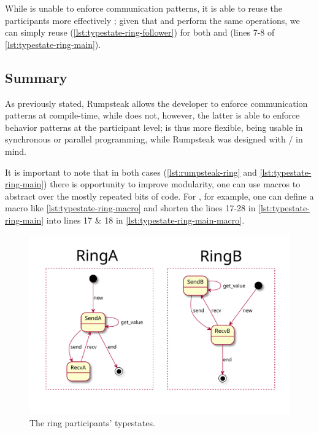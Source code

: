 While \textcolor{attrgreen}{} is unable to enforce communication patterns,
it is able to reuse the participants more effectively ;
given that \textcolor{structblue}{} and \textcolor{structblue}{} perform the same operations, we can simply reuse \textcolor{structblue}{} (\autoref{lst:typestate-ring-follower})
for both \textcolor{structblue}{} and \textcolor{structblue}{} (lines 7-8 of \autoref{lst:typestate-ring-main}).

\subsection{Summary}

As previously stated, Rumpsteak allows the developer to enforce communication patterns at compile-time,
while \textcolor{attrgreen}{} does not, however, the latter is able to enforce behavior patterns at the participant level;
\textcolor{attrgreen}{} is thus more flexible, being usable in synchronous or parallel programming,
while Rumpsteak was designed with / in mind.

It is important to note that in both cases (\autoref{lst:rumpsteak-ring} and \autoref{lst:typestate-ring-main})
there is opportunity to improve modularity,
one can use macros to abstract over the mostly repeated bits of code.
For \textcolor{attrgreen}{}, for example, one can define a macro like \autoref{lst:typestate-ring-macro} and
shorten the lines 17-28 in \autoref{lst:typestate-ring-main} into lines 17 \& 18 in \autoref{lst:typestate-ring-main-macro}.


\begin{figure}
    \centering
    \includegraphics[width=\linewidth]{Chapters/Figures/C5/rings.pdf}
    \caption{The ring participants' typestates.}
    \label{fig:ring-typestate}
\end{figure}

